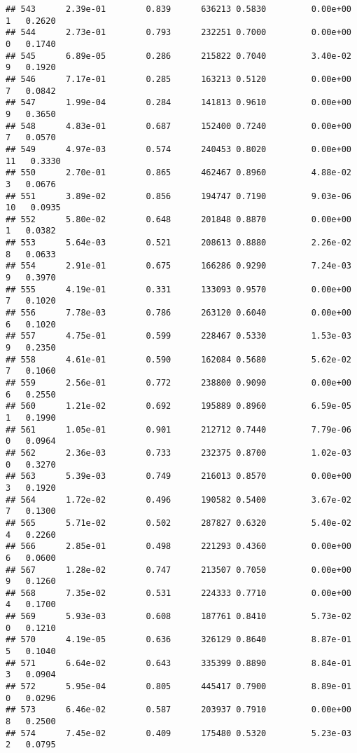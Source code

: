 \documentclass[
]{article}
\begin{document}
\begin{verbatim}
## 543      2.39e-01        0.839      636213 0.5830         0.00e+00   1   0.2620
## 544      2.73e-01        0.793      232251 0.7000         0.00e+00   0   0.1740
## 545      6.89e-05        0.286      215822 0.7040         3.40e-02   9   0.1920
## 546      7.17e-01        0.285      163213 0.5120         0.00e+00   7   0.0842
## 547      1.99e-04        0.284      141813 0.9610         0.00e+00   9   0.3650
## 548      4.83e-01        0.687      152400 0.7240         0.00e+00   7   0.0570
## 549      4.97e-03        0.574      240453 0.8020         0.00e+00  11   0.3330
## 550      2.70e-01        0.865      462467 0.8960         4.88e-02   3   0.0676
## 551      3.89e-02        0.856      194747 0.7190         9.03e-06  10   0.0935
## 552      5.80e-02        0.648      201848 0.8870         0.00e+00   1   0.0382
## 553      5.64e-03        0.521      208613 0.8880         2.26e-02   8   0.0633
## 554      2.91e-01        0.675      166286 0.9290         7.24e-03   9   0.3970
## 555      4.19e-01        0.331      133093 0.9570         0.00e+00   7   0.1020
## 556      7.78e-03        0.786      263120 0.6040         0.00e+00   6   0.1020
## 557      4.75e-01        0.599      228467 0.5330         1.53e-03   9   0.2350
## 558      4.61e-01        0.590      162084 0.5680         5.62e-02   7   0.1060
## 559      2.56e-01        0.772      238800 0.9090         0.00e+00   6   0.2550
## 560      1.21e-02        0.692      195889 0.8960         6.59e-05   1   0.1990
## 561      1.05e-01        0.901      212712 0.7440         7.79e-06   0   0.0964
## 562      2.36e-03        0.733      232375 0.8700         1.02e-03   0   0.3270
## 563      5.39e-03        0.749      216013 0.8570         0.00e+00   3   0.1920
## 564      1.72e-02        0.496      190582 0.5400         3.67e-02   7   0.1300
## 565      5.71e-02        0.502      287827 0.6320         5.40e-02   4   0.2260
## 566      2.85e-01        0.498      221293 0.4360         0.00e+00   6   0.0600
## 567      1.28e-02        0.747      213507 0.7050         0.00e+00   9   0.1260
## 568      7.35e-02        0.531      224333 0.7710         0.00e+00   4   0.1700
## 569      5.93e-03        0.608      187761 0.8410         5.73e-02   0   0.1210
## 570      4.19e-05        0.636      326129 0.8640         8.87e-01   5   0.1040
## 571      6.64e-02        0.643      335399 0.8890         8.84e-01   3   0.0904
## 572      5.95e-04        0.805      445417 0.7900         8.89e-01   0   0.0296
## 573      6.46e-02        0.587      203937 0.7910         0.00e+00   8   0.2500
## 574      7.45e-02        0.409      175480 0.5320         5.23e-03   2   0.0795

\end{verbatim}
\end{document}
